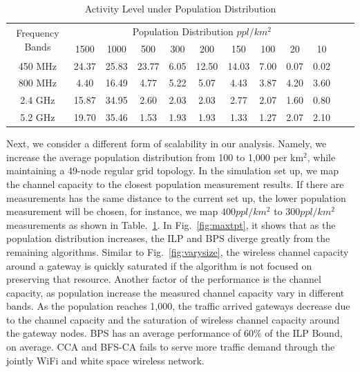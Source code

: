 \begin{table}
\centering %
\begin{tabular}{|c|c|c|c|c|c|c|c|c|c|c|c|} %
\hline %
 \multirow{2}{*}{Frequency Bands} & \multicolumn{9}{|c|}{Population Distribution $ppl/km^2$} \\
\cline{2-10}
		& 1500 & 1000 & 500 & 300 &  200 & 150 & 100 & 20 & 10 \\ %
\hline %
450 MHz &24.37	&25.83  &23.77	&6.05 &12.50  &14.03 & 7.00 & 0.07 & 0.02 \\      
\hline %
800 MHz &4.40 	&16.49  &4.77	&5.22&5.07 &4.43  & 3.87 & 4.20 & 3.60 \\      
\hline %
2.4 GHz &15.87 	&34.95  &2.60	&2.03&2.03 &2.77  & 2.07 & 1.60 & 0.80 \\      
\hline %
5.2 GHz &19.70	&35.46  &1.53	&1.93&1.93 &1.33  & 1.27 & 2.07 & 2.10 \\      
\hline %
\end{tabular}    
\caption{Activity Level under Population Distribution} %
\label{tab:activitymeasurement}    
\vspace{-0.3in}
\end{table}    

Next, we consider a different form of scalability in our analysis.  Namely,
we increase the average population distribution from 100 to 1,000 per km$^2$, while
maintaining a 49-node regular grid topology. In the simulation set up, we map the
channel capacity to the closest population measurement results. If there are 
measurements has the same distance to the current set up, the lower population 
measurement will be chosen, for instance, we map $400 ppl/km^2$ to $300 ppl/km^2$ 
measurements as shown in Table.~\ref{tab:activitymeasurement}. In Fig.~\ref{fig:maxtpt},
it shows that as the population distribution increases, the ILP and BPS diverge greatly 
from the remaining algorithms. Similar to Fig.~\ref{fig:varysize}, the wireless channel 
capacity around a gateway is quickly saturated if the algorithm is not focused on 
preserving that resource. Another factor of the performance is the channel capacity, 
as population increase the measured channel capacity vary in different bands.
As the population reaches 1,000, the traffic arrived gateways decrease due to the 
channel capacity and the saturation of wireless channel capacity around the gateway
nodes. BPS has an average performance of 60\% of the ILP Bound, on average. CCA and BFS-CA
fails to serve more traffic demand through the jointly WiFi and white space wireless
network. 

